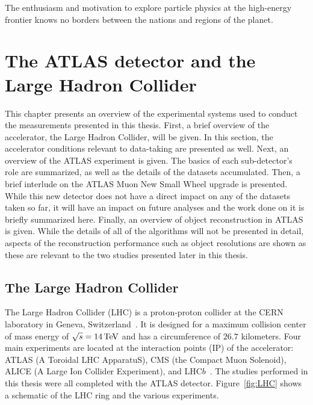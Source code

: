 \begin{savequote}[75mm]
The enthusiasm and motivation to explore particle physics at the high-energy frontier knows no borders between the nations and regions of the planet.
\end{savequote}

\chapter{The ATLAS detector and the Large Hadron Collider}

This chapter presents an overview of the experimental systems used to conduct the measurements presented in this thesis. First, a brief overview of the accelerator, the Large Hadron Collider, will be given. In this section, the accelerator conditions relevant to data-taking are presented as well. Next, an overview of the ATLAS experiment is given. The basics of each sub-detector's role are summarized, as well as the details of the datasets accumulated. Then, a brief interlude on the ATLAS Muon New Small Wheel upgrade is presented. While this new detector does not have a direct impact on any of the datasets taken so far, it will have an impact on future analyses and the work done on it is briefly summarized here. Finally, an overview of object reconstruction in ATLAS is given. While the details of all of the algorithms will not be presented in detail, aspects of the reconstruction performance such as object resolutions are shown as these are relevant to the two studies presented later in this thesis. 

\section{The Large Hadron Collider}

The Large Hadron Collider (LHC) is a proton-proton collider at the CERN laboratory in Geneva, Switzerland~\cite{LHCPaper}. It is designed for a maximum collision center of mass energy of $\sqrt{s} = 14 \TeV$ and has a circumference of $26.7$ kilometers. Four main experiments are located at the interaction points (IP) of the accelerator: ATLAS (A Toroidal LHC ApparatuS), CMS (the Compact Muon Solenoid), ALICE (A Large Ion Collider Experiment), and LHC$b$~\cite{ATLASPaper, CMSPaper, LHCbPaper, ALICEPaper}. The studies performed in this thesis were all completed with the ATLAS detector. Figure~\ref{fig:LHC} shows a schematic of the LHC ring and the various experiments.  

